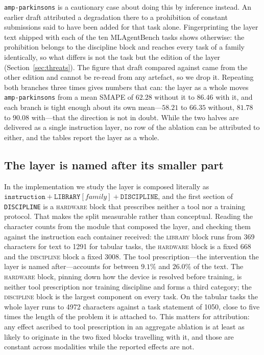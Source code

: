 \texttt{amp-parkinsons} is a cautionary case about doing this by inference
instead. An earlier draft attributed a degradation there to a prohibition of
constant submissions said to have been added for that task alone. Fingerprinting
the layer text shipped with each of the ten MLAgentBench tasks shows otherwise:
the prohibition belongs to the discipline block and reaches every task of a
family identically, so what differs is not the task but the edition of the layer
(Section~\ref{sec:threats}). The figure that draft compared against came from
the other edition and cannot be re-read from any artefact, so we drop it.
Repeating both branches three times gives numbers that can: the layer as a whole
moves \texttt{amp-parkinsons} from a mean SMAPE of $62.28$ without it to $86.46$
with it, and each branch is tight enough about its own mean---$58.21$ to $66.35$
without, $81.78$ to $90.08$ with---that the direction is not in doubt.
While the two halves are delivered as a single instruction layer, no row of the
ablation can be attributed to either, and the tables report the layer as a
whole.

\subsection{The layer is named after its smaller part}

In the implementation we study the layer is composed literally as
$\texttt{instruction} + \texttt{LIBRARY}[\textit{family}] + \texttt{DISCIPLINE}$,
and the first section of \texttt{DISCIPLINE} is a \textsc{hardware} block that
prescribes neither a tool nor a training protocol. That makes the split
measurable rather than conceptual. Reading the character counts from the module
that composed the layer, and checking them against the instruction each container
received: the \textsc{library} block runs from 369 characters for text to 1291
for tabular tasks, the \textsc{hardware} block is a fixed 668 and the
\textsc{discipline} block a fixed 3008. The tool prescription---the intervention the layer is named after---accounts for
between $9.1\%$ and $26.0\%$ of the text. The \textsc{hardware} block, pinning
down how the device is resolved before training, is neither tool prescription nor
training discipline and forms a third category; the \textsc{discipline} block is
the largest component on every task. On the tabular tasks the whole layer runs to 4972 characters against a task
statement of 1050, close to five times the length of the problem it is attached
to. This matters for attribution: any effect ascribed to tool prescription in an
aggregate ablation is at least as likely to originate in the two fixed blocks
travelling with it, and those are constant across modalities while the reported
effects are not.

